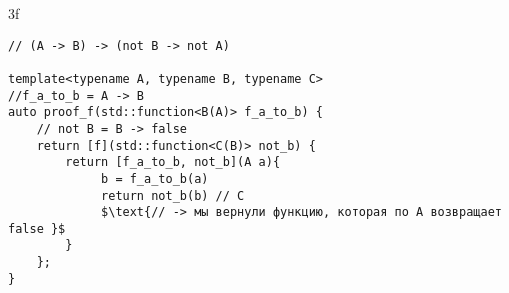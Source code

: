 \newpage

3f
\begin{lstlisting}[mathescape]
// (A -> B) -> (not B -> not A)

template<typename A, typename B, typename C>
//f_a_to_b = A -> B
auto proof_f(std::function<B(A)> f_a_to_b) {
    // not B = B -> false
    return [f](std::function<C(B)> not_b) {    
        return [f_a_to_b, not_b](A a){
             b = f_a_to_b(a)
             return not_b(b) // C
             $\text{// -> мы вернули функцию, которая по A возвращает false }$
        }       
    };
}
\end{lstlisting}